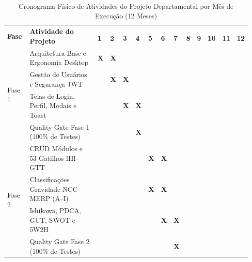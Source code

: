 \begin{table}[htbp]
\centering
\small
\caption{Cronograma Físico de Atividades do Projeto Departamental por Mês de Execução (12 Meses)}
\label{tab:cronograma-detalhado}
\setlength{\tabcolsep}{2.2pt}
\begin{tabularx}{\textwidth}{@{} l X *{12}{>{\centering\arraybackslash}p{4.2mm}} @{}}
\toprule
\multirow{2}{*}{\textbf{Fase}} & \multirow{2}{*}{\textbf{Atividade do Projeto}} & \multicolumn{12}{c}{\textbf{Mês de Execução (Ano 1)}} \\
\cmidrule(lr){3-14}
& & \textbf{1} & \textbf{2} & \textbf{3} & \textbf{4} & \textbf{5} & \textbf{6} & \textbf{7} & \textbf{8} & \textbf{9} & \textbf{10} & \textbf{11} & \textbf{12} \\
\midrule
\multirow{4}{*}{Fase 1} & Arquitetura Base e Ergonomia Desktop   & \cellcolor{clinical-100}\textcolor{clinical-900}{\textbf{X}} & \cellcolor{clinical-100}\textcolor{clinical-900}{\textbf{X}} & & & & & & & & & & \\
                        & Gestão de Usuários e Segurança JWT      & & \cellcolor{clinical-100}\textcolor{clinical-900}{\textbf{X}} & \cellcolor{clinical-100}\textcolor{clinical-900}{\textbf{X}} & & & & & & & & & \\
                        & Telas de Login, Perfil, Modais e Toast  & & & \cellcolor{clinical-100}\textcolor{clinical-900}{\textbf{X}} & \cellcolor{clinical-100}\textcolor{clinical-900}{\textbf{X}} & & & & & & & & \\
                        & Quality Gate Fase 1 (100\% de Testes)   & & & & \cellcolor{clinical-100}\textcolor{clinical-900}{\textbf{X}} & & & & & & & & \\
\midrule
\multirow{5}{*}{Fase 2} & CRUD Módulos e 53 Gatilhos IHI-GTT     & & & & & \cellcolor{clinical-100}\textcolor{clinical-900}{\textbf{X}} & \cellcolor{clinical-100}\textcolor{clinical-900}{\textbf{X}} & & & & & & \\
                        & Classificações Gravidade NCC MERP (A--I)& & & & & \cellcolor{clinical-100}\textcolor{clinical-900}{\textbf{X}} & \cellcolor{clinical-100}\textcolor{clinical-900}{\textbf{X}} & & & & & & \\
                        & Ishikawa, PDCA, GUT, SWOT e 5W2H        & & & & & & \cellcolor{clinical-100}\textcolor{clinical-900}{\textbf{X}} & \cellcolor{clinical-100}\textcolor{clinical-900}{\textbf{X}} & & & & & \\
                        & Quality Gate Fase 2 (100\% de Testes)   & & & & & & & \cellcolor{clinical-100}\textcolor{clinical-900}{\textbf{X}} & & & & & \\

\end{tabularx}
\end{table}
